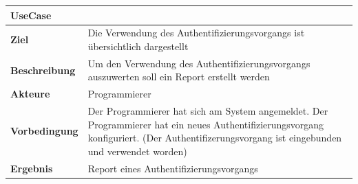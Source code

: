 \begin{longtable}[c]{@{}ll@{}}
\toprule
\begin{minipage}[b]{0.34\columnwidth}\raggedright\strut
\textbf{UseCase}
\strut\end{minipage} &
\begin{minipage}[b]{0.60\columnwidth}\raggedright\strut
\strut\end{minipage}\tabularnewline
\midrule
\endhead
\begin{minipage}[t]{0.34\columnwidth}\raggedright\strut
\textbf{Ziel}
\strut\end{minipage} &
\begin{minipage}[t]{0.60\columnwidth}\raggedright\strut
Die Verwendung des Authentifizierungsvorgangs ist übersichtlich
dargestellt
\strut\end{minipage}\tabularnewline
\begin{minipage}[t]{0.34\columnwidth}\raggedright\strut
\textbf{Beschreibung}
\strut\end{minipage} &
\begin{minipage}[t]{0.60\columnwidth}\raggedright\strut
Um den Verwendung des Authentifizierungsvorgangs auszuwerten soll ein
Report erstellt werden
\strut\end{minipage}\tabularnewline
\begin{minipage}[t]{0.34\columnwidth}\raggedright\strut
\textbf{Akteure}
\strut\end{minipage} &
\begin{minipage}[t]{0.60\columnwidth}\raggedright\strut
Programmierer
\strut\end{minipage}\tabularnewline
\begin{minipage}[t]{0.34\columnwidth}\raggedright\strut
\textbf{Vorbedingung}
\strut\end{minipage} &
\begin{minipage}[t]{0.60\columnwidth}\raggedright\strut
Der Programmierer hat sich am System angemeldet. Der Programmierer hat
ein neues Authentifizierungsvorgang konfiguriert. (Der
Authentifizerungsvorgang ist eingebunden und verwendet worden)
\strut\end{minipage}\tabularnewline
\begin{minipage}[t]{0.34\columnwidth}\raggedright\strut
\textbf{Ergebnis}
\strut\end{minipage} &
\begin{minipage}[t]{0.60\columnwidth}\raggedright\strut
Report eines Authentifizierungsvorgangs
\strut\end{minipage}\tabularnewline

\end{longtable}

